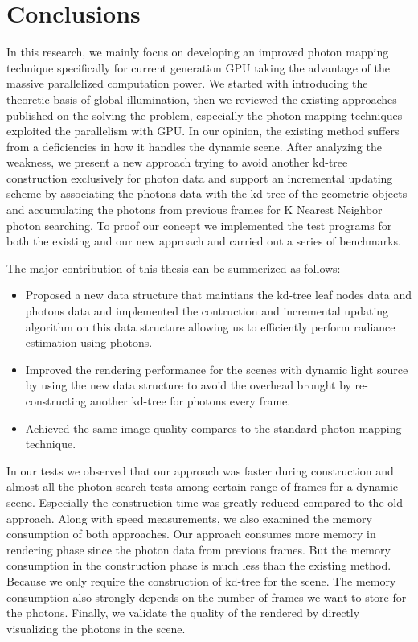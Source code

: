 \chapter{Conclusions}

In this research, we mainly focus on developing an improved photon mapping technique specifically for current generation GPU taking the advantage of the massive parallelized computation power. We started with introducing the theoretic basis of global illumination, then we reviewed the existing approaches published on the solving the problem, especially the photon mapping techniques exploited the parallelism with GPU. In our opinion, the existing method suffers from a deficiencies in how it handles the dynamic scene. After analyzing the weakness, we present a new approach trying to avoid another kd-tree construction exclusively for photon data and support an incremental updating scheme by associating the photons data with the kd-tree of the geometric objects and accumulating the photons from previous frames for K Nearest Neighbor photon searching. To proof our concept we implemented the test programs for both the existing and our new approach and carried out a series of benchmarks.

The major contribution of this thesis can be summerized as follows: 

\begin{itemize}
 
  \item Proposed a new data structure that maintians the kd-tree leaf nodes data and photons data and implemented the contruction and incremental updating algorithm on this data structure allowing us to efficiently perform radiance estimation using photons. 
  \item Improved the rendering performance for the scenes with dynamic light source by using the new data structure to avoid the overhead brought by re-constructing another kd-tree for photons every frame. 
  \item Achieved the same image quality compares to the standard photon mapping technique. 
 
\end{itemize}

In our tests we observed that our approach was faster during construction and almost all the photon search tests among certain range of frames for a dynamic scene. Especially the construction time was greatly reduced compared to the old approach. Along with speed measurements, we also examined the memory consumption of both approaches. Our approach consumes more memory in rendering phase since the photon data from previous frames. But the memory consumption in the construction phase is much less than the existing method. Because we only require the construction of kd-tree for the scene. The memory consumption also strongly depends on the number of frames we want to store for the photons. Finally, we validate the quality of the rendered by directly visualizing the photons in the scene.

